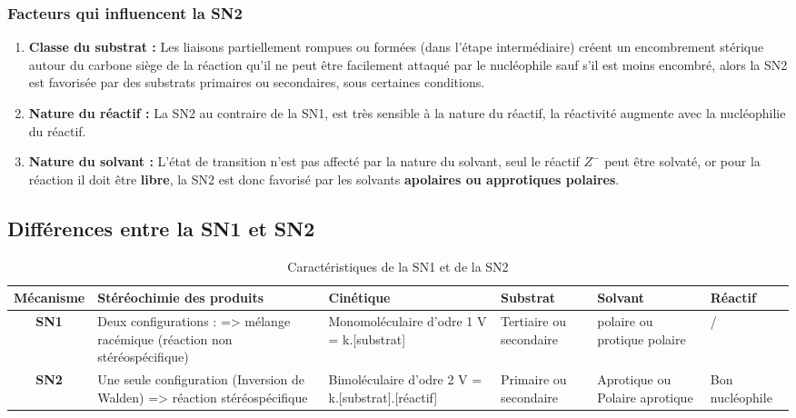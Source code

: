 \documentclass[a4paper, oneside]{book}
\begin{document}
\subsubsection{Facteurs qui influencent la SN2}
\begin{enumerate}
    \item \textbf{Classe du substrat :} Les liaisons partiellement rompues ou formées (dans l'étape intermédiaire) créent un encombrement stérique autour du carbone siège de la réaction qu'il ne peut être facilement attaqué par le nucléophile sauf s'il est moins encombré, alors la SN2 est favorisée par des substrats primaires ou secondaires, sous certaines conditions.
    \item \textbf{Nature du réactif :} La SN2 au contraire de la SN1, est très sensible à la nature du réactif, la réactivité augmente avec la nucléophilie du réactif.
    \item \textbf{Nature du solvant :} L'état de transition n'est pas affecté par la nature du solvant, seul le réactif $Z^-$ peut être solvaté, or pour la réaction il doit être \textbf{libre}, la SN2 est donc favorisé par les solvants \textbf{apolaires ou approtiques polaires}.
\end{enumerate}
\subsection{Différences entre la SN1 et SN2}
\begin{table}[!h]
    \centering
    \begin{tabular}{|c|p{5cm}|p{3cm}|p{2cm}|p{2cm}|p{2cm}|}
        \hline
        \textbf{Mécanisme} & \textbf{Stéréochimie des produits} & \textbf{Cinétique} & \textbf{Substrat} & \textbf{Solvant} & \textbf{Réactif} \\
        \hline
        \textbf{SN1} & Deux configurations : => mélange racémique (réaction non stéréospécifique) & Monomoléculaire d'odre 1 V = k.[substrat] & Tertiaire ou secondaire & polaire ou protique polaire & / \\
        \hline
        \textbf{SN2} & Une seule configuration (Inversion de Walden) => réaction stéréospécifique & Bimoléculaire d'odre 2 V = k.[substrat].[réactif] & Primaire ou secondaire & Aprotique ou Polaire aprotique & Bon nucléophile\\
        \hline
    \end{tabular}
    \caption{Caractéristiques de la SN1 et de la SN2}
    \label{tab:my_label}
\end{table}                     
\end{document}
